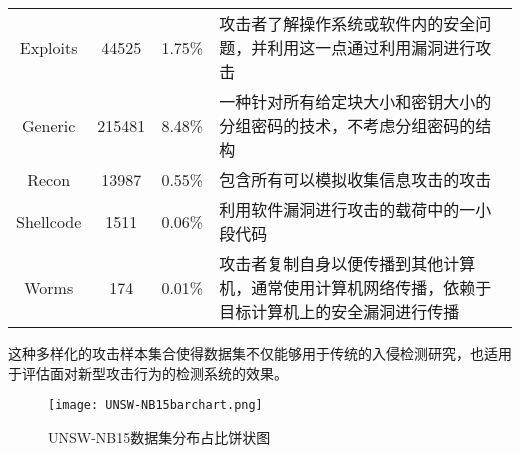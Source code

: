 \begin{table}[h]
\begin{tabularx}{\textwidth}{@{}cccX@{}}
		Exploits                          & 44525                             & 1.75\%                                  & 攻击者了解操作系统或软件内的安全问题，并利用这一点通过利用漏洞进行攻击                           \\

		Generic                           & 215481                            & 8.48\%                                  & 一种针对所有给定块大小和密钥大小的分组密码的技术，不考虑分组密码的结构                           \\

		Recon                             & 13987                             & 0.55\%                                  & 包含所有可以模拟收集信息攻击的攻击                                                               \\

		Shellcode                         & 1511                              & 0.06\%                                  & 利用软件漏洞进行攻击的载荷中的一小段代码                                                         \\

		Worms                             & 174                               & 0.01\%                                  & 攻击者复制自身以便传播到其他计算机，通常使用计算机网络传播，依赖于目标计算机上的安全漏洞进行传播 \\
		\bottomrule
	\end{tabularx}
\end{table}
这种多样化的攻击样本集合使得数据集不仅能够用于传统的入侵检测研究，也适用于评估面对新型攻击行为的检测系统的效果。
\begin{figure}[h]
	\centering
	\texttt{[image: UNSW-NB15barchart.png]}
	\caption{UNSW-NB15数据集分布占比饼状图}
	\label{fig:UNSW-NB15barchart}
\end{figure}

